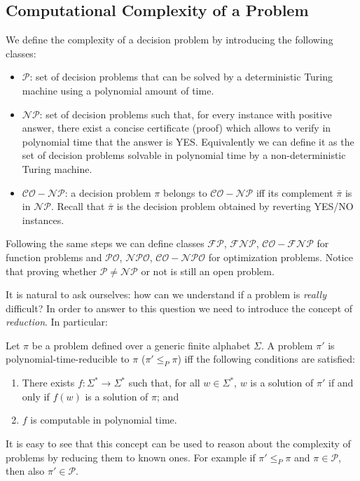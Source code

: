 \subsection{Computational Complexity of a Problem}
We define the complexity of a decision problem by introducing the following classes:
\begin{itemize}
	\item $\mathcal{P}$: set of decision problems that can be solved by a deterministic Turing machine using a polynomial amount of time.
	\item $\mathcal{NP}$: set of decision problems such that, for every instance with positive answer, there exist a concise certificate (proof) which allows to verify in polynomial time that the answer is YES. Equivalently we can define it as the set of decision problems solvable in polynomial time by a non-deterministic Turing machine.
	\item $\mathcal{CO-NP}$: a decision problem $\pi$ belongs to $\mathcal{CO-NP}$ iff its complement $\bar{\pi}$ is in $\mathcal{NP}$. Recall that $\bar{\pi}$ is the decision problem obtained by reverting YES/NO instances.
\end{itemize}
Following the same steps we can define classes $\mathcal{FP}$, $\mathcal{FNP}$, $\mathcal{CO-FNP}$ for function problems and $\mathcal{PO}$, $\mathcal{NPO}$, $\mathcal{CO-NPO}$ for optimization problems. Notice that proving whether $\mathcal{P}\neq\mathcal{NP}$ or not is still an open problem.

It is natural to ask ourselves: how can we understand if a problem is \textit{really} difficult? In order to answer to this question we need to introduce the concept of \textit{reduction}. In particular:
\begin{definition}
	Let $\pi$ be a problem defined over a generic finite alphabet $\Sigma$.
	A problem $\pi'$ is polynomial-time-reducible to $\pi$ ($\pi'\leq_{P}\pi$) iff the following conditions are satisfied:
	\begin{enumerate}
		\item There exists $f:\Sigma^{\ast}\rightarrow \Sigma^{\ast}$ such that, for all $w \in \Sigma^{\ast}$, $w$ is a solution of $\pi'$ if and only if $f(w)$ is a solution of $\pi$; and
		\item $f$ is computable in polynomial time.
	\end{enumerate}
\end{definition}
It is easy to see that this concept can be used to reason about the complexity of problems by reducing them to known ones. For example if $\pi'\leq_{P}\pi$ and $\pi\in \mathcal{P}$, then also $\pi'\in \mathcal{P}$.


